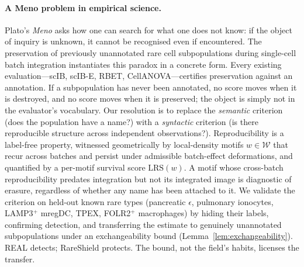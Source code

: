 
\paragraph*{A Meno problem in empirical science.}
Plato's \emph{Meno} asks how one can search for what one does not know: if the object of inquiry is unknown, it cannot be recognised even if encountered. The preservation of previously unannotated rare cell subpopulations during single-cell batch integration instantiates this paradox in a concrete form. Every existing evaluation---scIB, scIB-E, RBET, CellANOVA---certifies preservation against an annotation. If a subpopulation has never been annotated, no score moves when it is destroyed, and no score moves when it is preserved; the object is simply not in the evaluator's vocabulary. Our resolution is to replace the \emph{semantic} criterion (does the population have a name?) with a \emph{syntactic} criterion (is there reproducible structure across independent observations?). Reproducibility is a label-free property, witnessed geometrically by local-density motifs $w \in \mathcal{W}$ that recur across batches and persist under admissible batch-effect deformations, and quantified by a per-motif survival score $\mathrm{LRS}(w)$. A motif whose cross-batch reproducibility predates integration but not its integrated image is diagnostic of erasure, regardless of whether any name has been attached to it. We validate the criterion on held-out known rare types (pancreatic $\epsilon$, pulmonary ionocytes, LAMP3$^+$ mregDC, TPEX, FOLR2$^+$ macrophages) by hiding their labels, confirming detection, and transferring the estimate to genuinely unannotated subpopulations under an exchangeability bound (Lemma~\ref{lem:exchangeability}). REAL detects; RareShield protects. The bound, not the field's habits, licenses the transfer.
